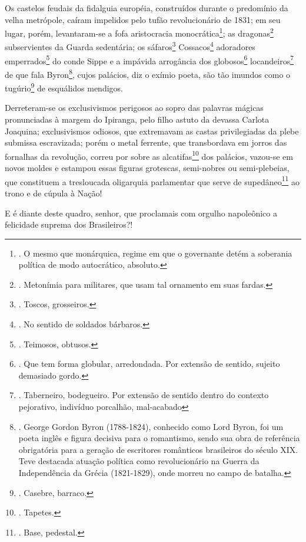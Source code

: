 Os castelos feudais da fidalguia européia, construídos durante o
predomínio da velha metrópole, caíram impelidos pelo tufão
revolucionário de 1831; em seu lugar, porém, levantaram-se a fofa
aristocracia monocrática\footnote{. O mesmo que monárquica, regime em
  que o governante detém a soberania política de modo autocrático,
  absoluto.}; as dragonas\footnote{. Metonímia para militares, que usam
  tal ornamento em suas fardas.} subservientes da Guarda sedentária; os
sáfaros\footnote{. Toscos, grosseiros.} Cossacos\footnote{. No sentido
  de soldados bárbaros.} adoradores emperrados\footnote{. Teimosos,
  obtusos.} do conde Sippe e a impávida arrogância dos
globosos\footnote{. Que tem forma globular, arredondada. Por extensão de
  sentido, sujeito demasiado gordo.} locandeiros\footnote{. Taberneiro,
  bodegueiro. Por extensão de sentido dentro do contexto pejorativo,
  indivíduo porcalhão, mal-acabado} de que fala Byron\footnote{. George
  Gordon Byron (1788-1824), conhecido como Lord Byron, foi um poeta
  inglês e figura decisiva para o romantismo, sendo sua obra de
  referência obrigatória para a geração de escritores românticos
  brasileiros do século XIX. Teve destacada atuação política como
  revolucionário na Guerra da Independência da Grécia (1821-1829), onde
  morreu no campo de batalha.}, cujos palácios, diz o exímio poeta, são
tão imundos como o tugúrio\footnote{. Casebre, barraco.} de esquálidos
mendigos.

Derreteram-se os exclusivismos perigosos ao sopro das palavras mágicas
pronunciadas à margem do Ipiranga, pelo filho astuto da devassa Carlota
Joaquina; exclusivismos odiosos, que extremavam as castas privilegiadas
da plebe submissa escravizada; porém o metal ferrente, que transbordava
em jorros das fornalhas da revolução, correu por sobre as
alcatifas\footnote{. Tapetes.} dos palácios, vazou-se em novos moldes e
estampou essas figuras grotescas, semi-nobres ou semi-plebeias, que
constituem a tresloucada oligarquia parlamentar que serve de
supedâneo\footnote{. Base, pedestal.} ao trono e de cúpula à Nação!

E é diante deste quadro, senhor, que proclamais com orgulho napoleônico
a felicidade suprema dos Brasileiros?!

